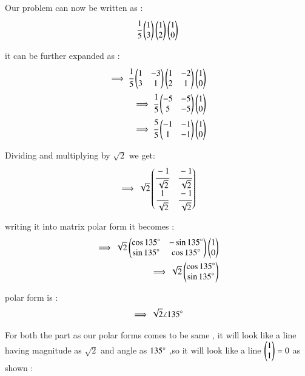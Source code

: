 \begin{enumerate}[label=\thesection.\arabic*.,ref=\thesection.\theenumi]
\begin{enumerate}
Our problem can now be written as :
\begin{align}
    \cfrac{1}{5}\begin{pmatrix}1 \\ 3\end{pmatrix}\begin{pmatrix}1\\2\end{pmatrix}\begin{pmatrix}1\\0\end{pmatrix}
\end{align}

it can be further expanded as :
\begin{align}
    \implies \cfrac{1}{5}\begin{pmatrix}1 & -3\\3 & 1\end{pmatrix}\begin{pmatrix}1 & -2\\2 & 1\end{pmatrix}\begin{pmatrix}1 \\ 0\end{pmatrix}
\\
    \implies \cfrac{1}{5}\begin{pmatrix}-5 & -5\\5 & -5\end{pmatrix}\begin{pmatrix}1 \\ 0\end{pmatrix}
\\
    \implies \cfrac{5}{5}\begin{pmatrix}-1 & -1\\1 & -1\end{pmatrix}\begin{pmatrix}1 \\ 0\end{pmatrix}
\end{align}

Dividing and multiplying by $\sqrt{2}$ we get:
\begin{align}
    \implies \sqrt{2}\begin{pmatrix}\cfrac{-1}{\sqrt{2}} & \cfrac{-1}{\sqrt{2}} \\ \cfrac{1}{\sqrt{2}} & \cfrac{-1}{\sqrt{2}}\end{pmatrix}
\end{align}

writing it into matrix polar form it becomes :
\begin{align}
    \implies \sqrt{2}\begin{pmatrix}\cos{135}\degree & -\sin{135}\degree\\ \sin{135}\degree & \cos{135}\degree\end{pmatrix}\begin{pmatrix}1 \\ 0\end{pmatrix}
\\
    \implies \sqrt{2}\begin{pmatrix}\cos{135}\degree \\ \sin{135}\degree\end{pmatrix}
\end{align}

polar form is :
\begin{align}
    \implies \sqrt{2} \angle 135 \degree
\end{align}

For both the part as our polar forms comes to be same , it will look like a line having magnitude as $\sqrt{2}$ and angle as $135\degree$
,so it will look like a line $\begin{pmatrix}1 \\ 1\end{pmatrix}=0$ as shown :


\end{enumerate}
\end{enumerate}
